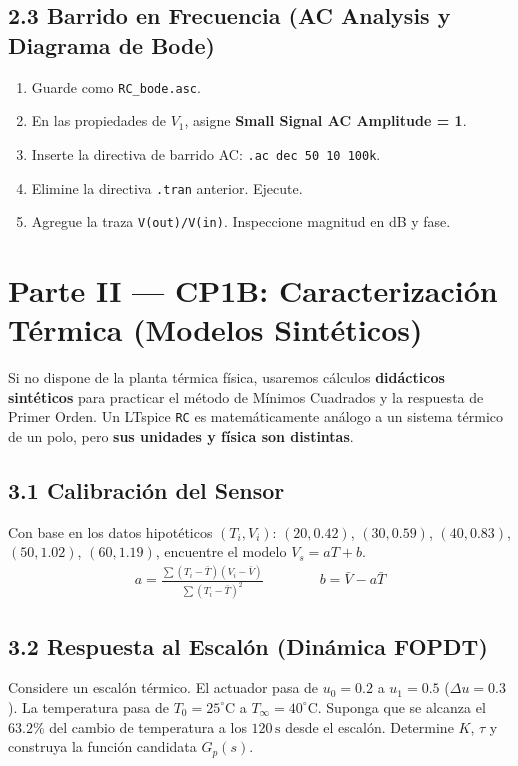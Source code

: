 \documentclass[11pt, a4paper]{article}
\begin{document}
\subsection{2.3 Barrido en Frecuencia (AC Analysis y Diagrama de Bode)}
\begin{enumerate}
    \item Guarde como \texttt{RC\_bode.asc}.
    \item En las propiedades de $V_1$, asigne \textbf{Small Signal AC Amplitude = 1}.
    \item Inserte la directiva de barrido AC: \texttt{.ac dec 50 10 100k}.
    \item Elimine la directiva \texttt{.tran} anterior. Ejecute.
    \item Agregue la traza \texttt{V(out)/V(in)}. Inspeccione magnitud en dB y fase.
\end{enumerate}

\section{Parte II — CP1B: Caracterización Térmica (Modelos Sintéticos)}

\begin{tcolorbox}[colback=blue!5, colframe=blue, title=\textbf{Nota de Transferencia Analógica}]
    Si no dispone de la planta térmica física, usaremos cálculos \textbf{didácticos sintéticos} para practicar el método de Mínimos Cuadrados y la respuesta de Primer Orden. Un LTspice \texttt{RC} es matemáticamente análogo a un sistema térmico de un polo, pero \textbf{sus unidades y física son distintas}.
\end{tcolorbox}

\subsection{3.1 Calibración del Sensor}
Con base en los datos hipotéticos $(T_i, V_i)$: $(20, 0.42)$, $(30, 0.59)$, $(40, 0.83)$, $(50, 1.02)$, $(60, 1.19)$, encuentre el modelo $V_s = aT + b$.
\begin{align*}
    a = \frac{\sum (T_i - \bar{T})(V_i - \bar{V})}{\sum (T_i - \bar{T})^2} \qquad \qquad b = \bar{V} - a\bar{T}
\end{align*}

\subsection{3.2 Respuesta al Escalón (Dinámica FOPDT)}
Considere un escalón térmico. El actuador pasa de $u_0 = 0.2$ a $u_1 = 0.5$ ($\Delta u = 0.3$). La temperatura pasa de $T_0 = 25^\circ\text{C}$ a $T_\infty = 40^\circ\text{C}$. Suponga que se alcanza el $63.2\%$ del cambio de temperatura a los $120\,\text{s}$ desde el escalón. Determine $K$, $\tau$ y construya la función candidata $G_p(s)$.
\end{document}
